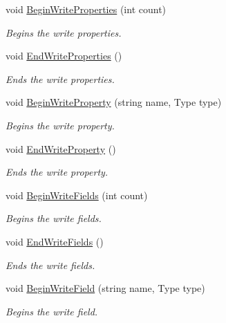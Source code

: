\begin{DoxyCompactItemize}
void \hyperlink{interface_serialization_1_1_i_storage_a4aa8e9eeb65572cabfd1163fd424f447}{Begin\+Write\+Properties} (int count)
\begin{DoxyCompactList}\small\item\em Begins the write properties. \end{DoxyCompactList}\item 
void \hyperlink{interface_serialization_1_1_i_storage_ad922a8b40756c84f00aa6afd75b93735}{End\+Write\+Properties} ()
\begin{DoxyCompactList}\small\item\em Ends the write properties. \end{DoxyCompactList}\item 
void \hyperlink{interface_serialization_1_1_i_storage_a0b810350295c5e78aca277ce929aaedd}{Begin\+Write\+Property} (string name, Type type)
\begin{DoxyCompactList}\small\item\em Begins the write property. \end{DoxyCompactList}\item 
void \hyperlink{interface_serialization_1_1_i_storage_a978b5e23e42f8db83095b9dfd1102528}{End\+Write\+Property} ()
\begin{DoxyCompactList}\small\item\em Ends the write property. \end{DoxyCompactList}\item 
void \hyperlink{interface_serialization_1_1_i_storage_a101b3acfd63c956c27cd9d45e2c4d7c1}{Begin\+Write\+Fields} (int count)
\begin{DoxyCompactList}\small\item\em Begins the write fields. \end{DoxyCompactList}\item 
void \hyperlink{interface_serialization_1_1_i_storage_a8584d495d876a2b05ba671de46e33006}{End\+Write\+Fields} ()
\begin{DoxyCompactList}\small\item\em Ends the write fields. \end{DoxyCompactList}\item 
void \hyperlink{interface_serialization_1_1_i_storage_a70f3334f87463abfe43c5d256c2486fe}{Begin\+Write\+Field} (string name, Type type)
\begin{DoxyCompactList}\small\item\em Begins the write field. \end{DoxyCompactList}\item 

\end{DoxyCompactItemize}
